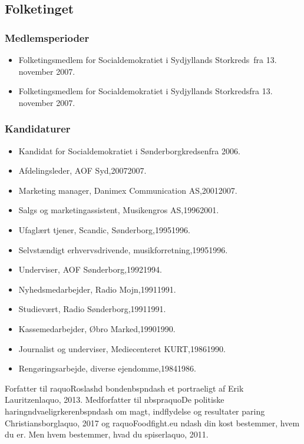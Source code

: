 \documentclass[11pt, a4paper]{awesome-cv}
\begin{document}
\begin{cvletter}
\subsection*{Folketinget}
\subsubsection*{Medlemsperioder}
\begin{itemize}
\item Folketingsmedlem for Socialdemokratiet i Sydjyllands Storkreds fra 13. november 2007.
\item Folketingsmedlem for Socialdemokratiet i Sydjyllands Storkredsfra 13. november 2007.
\end{itemize}
\subsubsection*{Kandidaturer}
\begin{itemize}
\item Kandidat for Socialdemokratiet i Sønderborgkredsenfra 2006.
\end{itemize}
\begin{itemize}
\item Afdelingsleder, AOF Syd,20072007.
\item Marketing manager, Danimex Communication AS,20012007.
\item Salgs og marketingassistent, Musikengros AS,19962001.
\item Ufaglært tjener, Scandic, Sønderborg,19951996.
\item Selvstændigt erhvervsdrivende, musikforretning,19951996.
\item Underviser, AOF Sønderborg,19921994.
\item Nyhedsmedarbejder, Radio Mojn,19911991.
\item Studievært, Radio Sønderborg,19911991.
\item Kassemedarbejder, Øbro Marked,19901990.
\item Journalist og underviser, Mediecenteret KURT,19861990.
\item Rengøringsarbejde, diverse ejendomme,19841986.
\end{itemize}
Forfatter til raquoRoslashd bondenbspndash et portraeligt af Erik Lauritzenlaquo, 2013. Medforfatter til nbspraquoDe politiske haringndvaeligrkerenbspndash om magt, indflydelse og resultater paring Christiansborglaquo, 2017 og raquoFoodfight.eu ndash din kost bestemmer, hvem du er. Men hvem bestemmer, hvad du spiserlaquo, 2011.

\end{cvletter}
\end{document}
